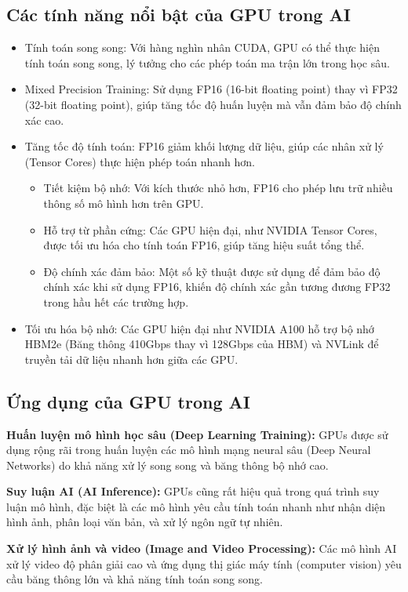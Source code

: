 \documentclass[a4paper]{article}
\begin{document}
\subsection{Các tính năng nổi bật của GPU trong AI}
\begin{itemize}
    \item Tính toán song song: Với hàng nghìn nhân CUDA, GPU có thể thực hiện tính toán song song, lý tưởng cho các phép toán ma trận lớn trong học sâu.
    \item Mixed Precision Training: Sử dụng FP16 (16-bit floating point) thay vì FP32 (32-bit floating point), giúp tăng tốc độ huấn luyện mà vẫn đảm bảo độ chính xác cao.
    \item Tăng tốc độ tính toán: FP16 giảm khối lượng dữ liệu, giúp các nhân xử lý (Tensor Cores) thực hiện phép toán nhanh hơn.
    \begin{itemize}
        \item Tiết kiệm bộ nhớ: Với kích thước nhỏ hơn, FP16 cho phép lưu trữ nhiều thông số mô hình hơn trên GPU.
        \item Hỗ trợ từ phần cứng: Các GPU hiện đại, như NVIDIA Tensor Cores, được tối ưu hóa cho tính toán FP16, giúp tăng hiệu suất tổng thể.
        \item Độ chính xác đảm bảo: Một số kỹ thuật được sử dụng để đảm bảo độ chính xác khi sử dụng FP16, khiến độ chính xác gần tương đương FP32 trong hầu hết các trường hợp.
    \end{itemize}
    \item Tối ưu hóa bộ nhớ: Các GPU hiện đại như NVIDIA A100 hỗ trợ bộ nhớ HBM2e (Băng thông 410Gbps thay vì 128Gbps của HBM) và NVLink để truyền tải dữ liệu nhanh hơn giữa các GPU.
\end{itemize}

\subsection{Ứng dụng của GPU trong AI}
\textbf{Huấn luyện mô hình học sâu (Deep Learning Training):} GPUs được sử dụng rộng rãi
trong huấn luyện các mô hình mạng neural sâu (Deep Neural Networks) do khả năng xử lý
song song và băng thông bộ nhớ cao.

\textbf{Suy luận AI (AI Inference):} GPUs cũng rất hiệu quả trong quá trình suy luận mô hình,
đặc biệt là các mô hình yêu cầu tính toán nhanh như nhận diện hình ảnh, phân loại văn bản,
và xử lý ngôn ngữ tự nhiên.

\textbf{Xử lý hình ảnh và video (Image and Video Processing):} Các mô hình AI xử lý video
độ phân giải cao và ứng dụng thị giác máy tính (computer vision) yêu cầu băng thông lớn và
khả năng tính toán song song.
\end{document}
